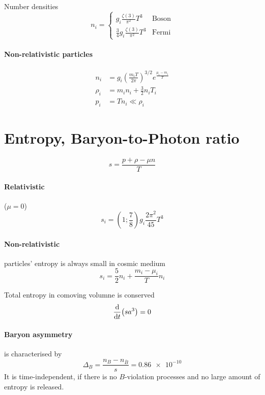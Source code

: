 \documentclass[12pt, a4paper, DIV=15]{article}
\numberwithin{equation}{section}
\begin{document}
Number densities
\begin{equation}
   n_i =
   \begin{cases}
      g_i \frac{\zeta(3)}{\pi^2} T^3 & \text{Boson} \\
      \frac{3}{4} g_i \frac{\zeta(3)}{\pi^2} T^3 & \text{Fermi}
   \end{cases}
\end{equation}

\paragraph{Non-relativistic particles}
\begin{align}
   n_i &= g_i \left( \frac{m_i T}{2\pi} \right)^{3/2} e^{\frac{\mu_i - m_i}{T}} \\
   \rho_i &= m_i n_i + \frac{3}{2} n_i T_i \\
   p_i &= T n_i \ll \rho_i
\end{align}

\section{Entropy, Baryon-to-Photon ratio}
\begin{equation}
   s = \frac{p + \rho -\mu n }{ T} 
\end{equation}

\paragraph{Relativistic} ($\mu = 0$)
\begin{equation}
   s_i = (1; \frac{7}{8}) g_i \frac{2\pi^2}{45} T^3
\end{equation}

\paragraph{Non-relativistic} particles' entropy is always small in cosmic medium
\begin{equation}
   s_i = \frac{5}{2} n_i + \frac{m_i - \mu_i}{T}n_i
\end{equation}

Total entropy in comoving volumne is conserved
\begin{equation}
   \dv{t} (sa^3) = 0
\end{equation}

\paragraph{Baryon asymmetry} is characterised by
\begin{equation}
   \Delta_B =  \frac{n_B - n_{\bar{B}}}{s} = \num{0.86e-10}
\end{equation}
It is time-independent, if there is no $B$-violation processes and no large amount of entropy is released.
\end{document}
